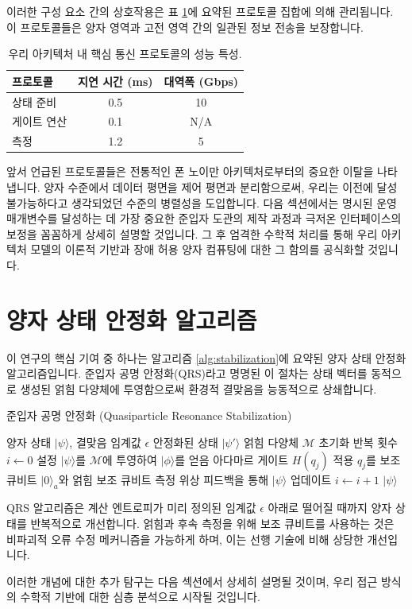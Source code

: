이러한 구성 요소 간의 상호작용은 표 \ref{tab:protocols}에 요약된 프로토콜 집합에 의해 관리됩니다. 이 프로토콜들은 양자 영역과 고전 영역 간의 일관된 정보 전송을 보장합니다.

\begin{table}[h!]
    \centering
    \begin{tabular}{|l|c|c|}
        \hline
        \textbf{프로토콜} & \textbf{지연 시간 (ms)} & \textbf{대역폭 (Gbps)} \\
        \hline
        상태 준비 & 0.5 & 10 \\
        게이트 연산 & 0.1 & N/A \\
        측정 & 1.2 & 5 \\
        \hline
    \end{tabular}
    \caption{우리 아키텍처 내 핵심 통신 프로토콜의 성능 특성.}
    \label{tab:protocols}
\end{table}

앞서 언급된 프로토콜들은 전통적인 폰 노이만 아키텍처로부터의 중요한 이탈을 나타냅니다. 양자 수준에서 데이터 평면을 제어 평면과 분리함으로써, 우리는 이전에 달성 불가능하다고 생각되었던 수준의 병렬성을 도입합니다. 다음 섹션에서는 명시된 운영 매개변수를 달성하는 데 가장 중요한 준입자 도관의 제작 과정과 극저온 인터페이스의 보정을 꼼꼼하게 상세히 설명할 것입니다. 그 후 엄격한 수학적 처리를 통해 우리 아키텍처 모델의 이론적 기반과 장애 허용 양자 컴퓨팅에 대한 그 함의를 공식화할 것입니다.

\section{양자 상태 안정화 알고리즘}
이 연구의 핵심 기여 중 하나는 알고리즘 \ref{alg:stabilization}에 요약된 양자 상태 안정화 알고리즘입니다. 준입자 공명 안정화(QRS)라고 명명된 이 절차는 상태 벡터를 동적으로 생성된 얽힘 다양체에 투영함으로써 환경적 결맞음을 능동적으로 상쇄합니다.

\begin{algorithm}[h!]
\caption{준입자 공명 안정화 (Quasiparticle Resonance Stabilization)}
\label{alg:stabilization}
\begin{algorithmic}[1]
\REQUIRE 양자 상태 $|\psi\rangle$, 결맞음 임계값 $\epsilon$
\ENSURE 안정화된 상태 $|\psi'\rangle$
\STATE 얽힘 다양체 $\mathcal{M}$ 초기화
\STATE 반복 횟수 $i \leftarrow 0$ 설정
    \STATE $|\psi\rangle$를 $\mathcal{M}$에 투영하여 $|\phi\rangle$를 얻음
            \STATE 아다마르 게이트 $H(q_j)$ 적용
        \ELSE
            \STATE $q_j$를 보조 큐비트 $|0\rangle_a$와 얽힘
        \ENDIF
    \ENDFOR
    \STATE 보조 큐비트 측정
    \STATE 위상 피드백을 통해 $|\psi\rangle$ 업데이트
    \STATE $i \leftarrow i + 1$
\ENDWHILE
\RETURN $|\psi\rangle$
\end{algorithmic}
\end{algorithm}

QRS 알고리즘은 계산 엔트로피가 미리 정의된 임계값 $\epsilon$ 아래로 떨어질 때까지 양자 상태를 반복적으로 개선합니다. 얽힘과 후속 측정을 위해 보조 큐비트를 사용하는 것은 비파괴적 오류 수정 메커니즘을 가능하게 하며, 이는 선행 기술에 비해 상당한 개선입니다.

이러한 개념에 대한 추가 탐구는 다음 섹션에서 상세히 설명될 것이며, 우리 접근 방식의 수학적 기반에 대한 심층 분석으로 시작될 것입니다.
